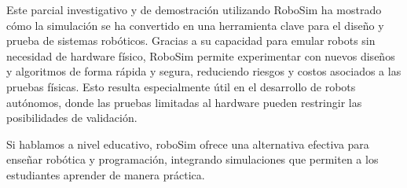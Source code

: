 Este parcial investigativo y de demostración utilizando RoboSim ha mostrado cómo la simulación se ha convertido en una herramienta clave para el diseño y prueba de sistemas robóticos. Gracias a su capacidad para emular robots sin necesidad de hardware físico, RoboSim permite experimentar con nuevos diseños y algoritmos de forma rápida y segura, reduciendo riesgos y costos asociados a las pruebas físicas. Esto resulta especialmente útil en el desarrollo de robots autónomos, donde las pruebas limitadas al hardware pueden restringir las posibilidades de validación.

Si hablamos a nivel educativo, roboSim ofrece una alternativa efectiva para enseñar robótica y programación, integrando simulaciones que permiten a los estudiantes aprender de manera práctica.